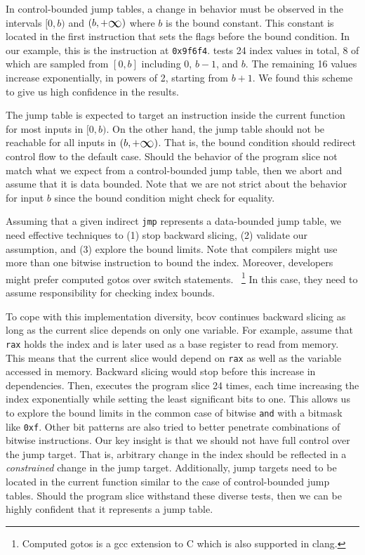In control-bounded jump tables, a change in behavior must be observed in the intervals $[0,b)$ and $(b,\plusinfty)$ where $b$ is the bound constant.
This constant is located in the first instruction that sets the flags before the bound condition.
In our example, this is the instruction at \texttt{0x9f6f4}.
{\bcov} tests 24 index values in total, 8 of which are sampled from $[0,b]$ including $0$, $b-1$, and $b$.
The remaining 16 values increase exponentially, in powers of 2, starting from $b+1$.
We found this scheme to give us high confidence in the results.

The jump table is expected to target an instruction inside the current function for most inputs in $[0,b)$.
On the other hand, the jump table should not be reachable for all inputs in $(b,\plusinfty)$.
That is, the bound condition should redirect control flow to the default case.
Should the behavior of the program slice not match what we expect from a control-bounded jump table,
then we abort and assume that it is data bounded.
Note that we are not strict about the behavior for input $b$ since the bound condition might check for equality.

Assuming that a given indirect \texttt{jmp} represents a data-bounded jump table, we need
effective techniques to (1) stop backward slicing, (2) validate our assumption, and (3) explore
the bound limits.
Note that compilers might use more than one bitwise instruction to bound the index. 
Moreover, developers might prefer computed gotos over switch statements. ~\footnote{Computed gotos is a \textsf{gcc} extension to C which is also supported in \textsf{clang}.}
In this case, they need to assume responsibility for checking index bounds. 

To cope with this implementation diversity, bcov continues backward slicing as long as the current slice depends on only one variable. 
For example, assume that \texttt{rax} holds the index and is later used as a base register to read from memory. 
This means that the current slice would depend on \texttt{rax} as well as the variable accessed in memory. 
Backward slicing would stop before this increase in dependencies.
Then, \bcov{} executes the program slice 24 times, each time increasing the index exponentially while setting the least significant bits to one.
This allows us to explore the bound limits in the common case of bitwise \texttt{and} with a bitmask like \texttt{0xf}.
Other bit patterns are also tried to better penetrate combinations of bitwise instructions.
Our key insight is that we should not have full control over the jump target.
That is, arbitrary change in the index should be reflected in a \textit{constrained} change in the jump target.
Additionally, jump targets need to be located in the current function similar to the case of control-bounded jump tables.
Should the program slice withstand these diverse tests, then we can be highly confident that it represents a jump table.

